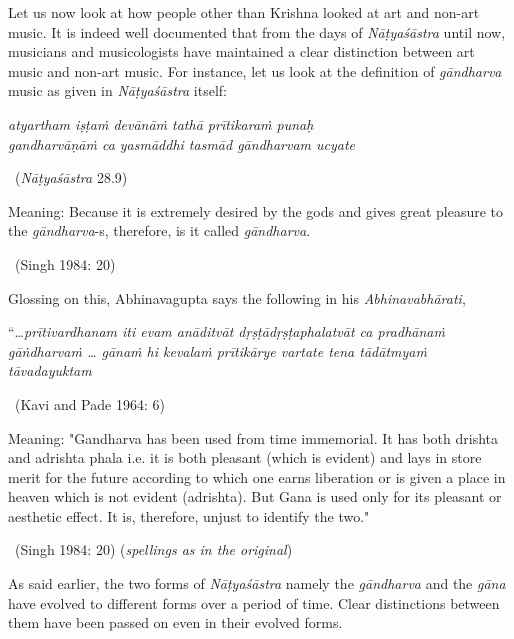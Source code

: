 Let us now look at how people other than Krishna looked at art and non-art music. It is indeed well documented that from the days of \textit{Nāṭyaśāstra} until now, musicians and musicologists have maintained a clear distinction between art music and non-art music. For instance, let us look at the definition of \textit{gāndharva} music as given in \textit{Nāṭyaśāstra} itself:

\begin{myquote}
\textit{atyartham iṣṭaṁ devānāṁ tathā prītikaraṁ punaḥ }\\\textit{gandharvāṇāṁ ca yasmāddhi tasmād gāndharvam ucyate } 

~\hfill (\textit{Nāṭyaśāstra} 28.9)
\end{myquote}

\begin{myquote}
Meaning: Because it is extremely desired by the gods and gives great pleasure to the \textit{gāndharva}-s, therefore, is it called \textit{gāndharva}. 

~\hfill (Singh 1984: 20)
\end{myquote}

Glossing on this, Abhinavagupta says the following in his \textit{Abhinavabhārati},

\begin{myquote}
“…\textit{prītivardhanam iti evam anāditvāt dṛṣṭādṛṣṭaphalatvāt ca pradhānaṁ gāṅdharvaṁ … gānaṁ hi kevalaṁ prītikārye vartate  tena tādātmyaṁ tāvadayuktam } 

~\hfill (Kavi and Pade 1964: 6)
\end{myquote}

\begin{myquote}
Meaning: "Gandharva has been used from time immemorial. It has both drishta and adrishta phala i.e. it is both pleasant (which is evident) and lays in store merit for the future according to which one earns liberation or is given a place in heaven which is not evident (adrishta). But Gana is used only for its pleasant or aesthetic effect. It is, therefore, unjust to identify the two." 

~\hfill (Singh 1984: 20) (\textit{spellings as in the original})
\end{myquote}

As said earlier, the two forms of \textit{Nāṭyaśāstra} namely the \textit{gāndharva} and the \textit{gāna} have evolved to different forms over a period of time. Clear distinctions between them have been passed on even in their evolved forms.

